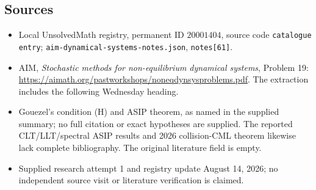 \documentclass[11pt]{article}
\begin{document}
\subsection{Sources}
\begin{itemize}
\item Local UnsolvedMath registry, permanent ID \(20001404\), source code \texttt{catalogue entry}; \texttt{aim-dynamical-systems-notes.json}, \texttt{notes[61]}.
\item AIM, \emph{Stochastic methods for non-equilibrium dynamical systems}, Problem 19: \url{https://aimath.org/pastworkshops/noneqdynsysproblems.pdf}. The extraction includes the following Wednesday heading.
\item Gouezel's condition (H) and ASIP theorem, as named in the supplied summary; no full citation or exact hypotheses are supplied. The reported CLT/LLT/spectral ASIP results and 2026 collision-CML theorem likewise lack complete bibliography. The original literature field is empty.
\item Supplied research attempt 1 and registry update August 14, 2026; no independent source visit or literature verification is claimed.
\end{itemize}
\end{document}
